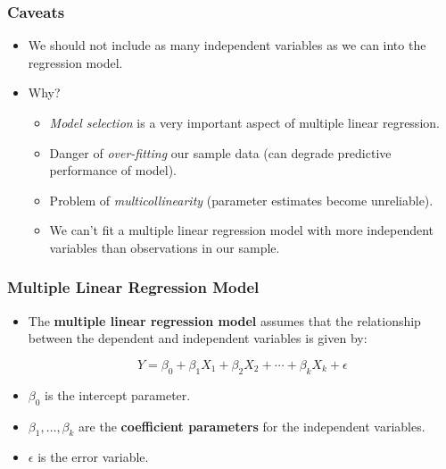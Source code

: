\documentclass[14pt]{beamer}
\begin{document}
\begin{frame}
	\frametitle{Caveats}
	
	\begin{itemize}[label={\color{blue}$\blacktriangleright$}]
		\item We should not include as many independent variables as we can into the regression model.
		
		\item Why?
		\begin{itemize}[label={\color{blue}$\blacktriangleright$}]
			\item \textit{Model selection} is a very important aspect of multiple linear regression.
			
			\item Danger of \textit{over-fitting} our sample data (can degrade predictive performance of model).
			
			\item Problem of \textit{multicollinearity} (parameter estimates become unreliable).
			
			\item We can't fit a multiple linear regression model with more independent variables than observations in our sample.
		\end{itemize}
	\end{itemize}
	
\end{frame}
\begin{frame}
	\frametitle{Multiple Linear Regression Model}
	
	\begin{itemize}[label={\color{blue}$\blacktriangleright$}]
		\item The \textbf{multiple linear regression model} assumes that the relationship between the dependent and independent variables is given by:
		
		\[
		Y = \beta_0 + \beta_1X_1 + \beta_2X_2 + \cdots + \beta_kX_k + \epsilon
		\]
		
		\item $\beta_0$ is the intercept parameter.
		
		\item $\beta_1,\ldots,\beta_k$ are the \textbf{coefficient parameters} for the independent variables.
		
		\item $\epsilon$ is the error variable.
	\end{itemize}
	
\end{frame}
\end{document}
